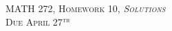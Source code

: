 \documentclass[12pt]{article} %
\begin{document}
\begin{center}
   \textsc{\large MATH 272, Homework 10, \emph{Solutions}}\\
   \textsc{Due April 27$^\textrm{th}$}
\end{center}
\vspace{.5cm}



\newpage
\end{document}
